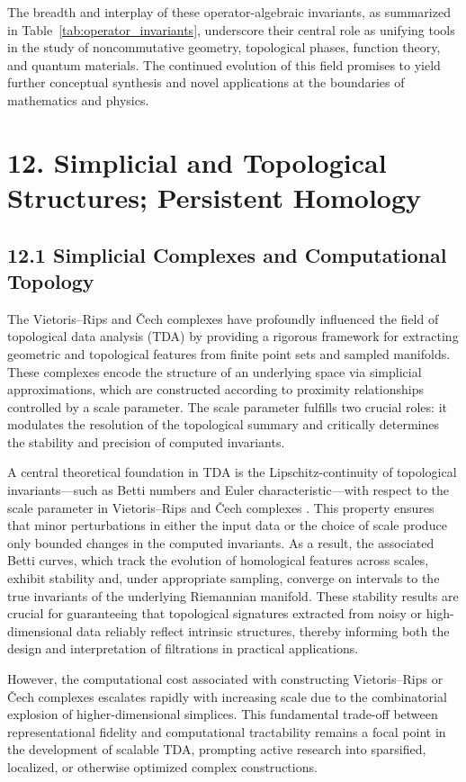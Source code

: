 \documentclass[11pt]{article}
\begin{document}
The breadth and interplay of these operator-algebraic invariants, as summarized in Table~\ref{tab:operator_invariants}, underscore their central role as unifying tools in the study of noncommutative geometry, topological phases, function theory, and quantum materials. The continued evolution of this field promises to yield further conceptual synthesis and novel applications at the boundaries of mathematics and physics.

\section{12. Simplicial and Topological Structures; Persistent Homology}

\subsection{12.1 Simplicial Complexes and Computational Topology}

The Vietoris–Rips and Čech complexes have profoundly influenced the field of topological data analysis (TDA) by providing a rigorous framework for extracting geometric and topological features from finite point sets and sampled manifolds. These complexes encode the structure of an underlying space via simplicial approximations, which are constructed according to proximity relationships controlled by a scale parameter. The scale parameter fulfills two crucial roles: it modulates the resolution of the topological summary and critically determines the stability and precision of computed invariants.

A central theoretical foundation in TDA is the Lipschitz-continuity of topological invariants—such as Betti numbers and Euler characteristic—with respect to the scale parameter in Vietoris–Rips and Čech complexes \cite{ref88}. This property ensures that minor perturbations in either the input data or the choice of scale produce only bounded changes in the computed invariants. As a result, the associated Betti curves, which track the evolution of homological features across scales, exhibit stability and, under appropriate sampling, converge on intervals to the true invariants of the underlying Riemannian manifold. These stability results are crucial for guaranteeing that topological signatures extracted from noisy or high-dimensional data reliably reflect intrinsic structures, thereby informing both the design and interpretation of filtrations in practical applications.

However, the computational cost associated with constructing Vietoris–Rips or Čech complexes escalates rapidly with increasing scale due to the combinatorial explosion of higher-dimensional simplices. This fundamental trade-off between representational fidelity and computational tractability remains a focal point in the development of scalable TDA, prompting active research into sparsified, localized, or otherwise optimized complex constructions.
\end{document}
